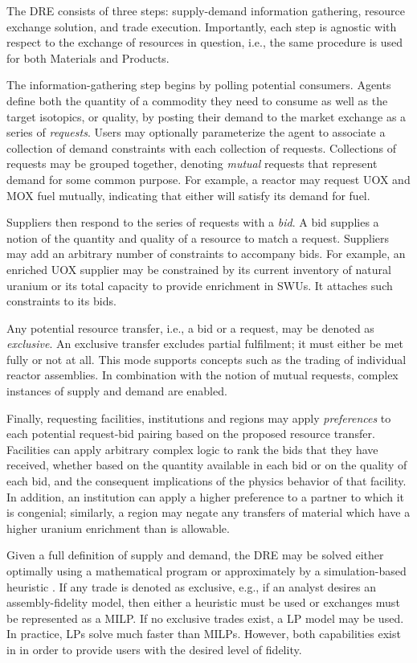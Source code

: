 The \gls{DRE} consists of three steps: supply-demand information
gathering, resource exchange solution, and trade execution. Importantly, each
step is agnostic with respect to the exchange of resources in question, i.e.,
the same procedure is used for both Materials and Products.

The information-gathering step begins by polling potential consumers. Agents
define both the quantity of a commodity they need to consume as well as the
target isotopics, or quality, by posting their demand to the market exchange as
a series of \textit{requests}. Users may optionally parameterize the agent to
associate a collection of demand constraints with each collection of requests.
Collections of requests may be grouped together, denoting \textit{mutual}
requests that represent demand for
some common purpose. For example, a reactor may request \gls{UOX} and \gls{MOX} fuel
mutually, indicating that either will satisfy its demand for fuel.

Suppliers then respond to the series of requests with a \textit{bid}. A bid
supplies a notion of the quantity and quality of a resource to match a
request. Suppliers may add an arbitrary number of constraints to accompany
bids. For example, an enriched \gls{UOX} supplier may be constrained by its current
inventory of natural uranium or its total capacity to provide enrichment
in \glspl{SWU}. It attaches such constraints to its bids.

Any potential resource transfer, i.e., a bid or a request, may be denoted as
\textit{exclusive}. An exclusive transfer excludes partial fulfilment; it must
either be met fully or not at all. This mode supports concepts such as the
trading of individual reactor assemblies.  In combination with the notion of
mutual requests, complex instances
of supply and demand are enabled.

Finally, requesting facilities, institutions and regions may apply
\textit{preferences} to each potential request-bid pairing based on the proposed
resource transfer. Facilities can apply arbitrary complex logic to rank the bids
that they have received, whether based on the quantity available in each bid or
on the quality of each bid, and the consequent implications of the physics behavior
of that facility. In addition, an institution can apply a higher preference to a
partner to which it is congenial; similarly, a region may negate any transfers
of material which have a higher uranium enrichment than is allowable.

Given a full definition of supply and demand, the \gls{DRE} may be solved either
optimally using a mathematical program or approximately by a simulation-based
heuristic \cite{gidden_agent-based_2015}. If any trade is denoted as exclusive, e.g., if an
analyst desires an assembly-fidelity model, then either a heuristic must be used
or exchanges must be represented as a \gls{MILP}. If no exclusive trades exist,
a \gls{LP} model may be used. In practice, \glspl{LP} solve much faster than
\glspl{MILP}. However, both capabilities exist in \Cyclus in order to
provide users with the desired level of fidelity.

